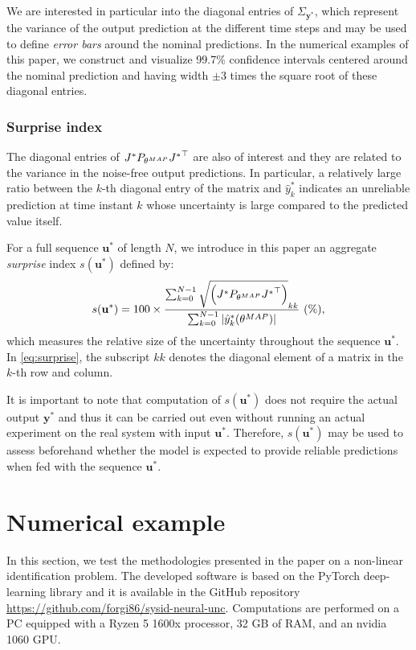 \documentclass{ifacconf}
\newcommand{\nsamp}{N}
\newcommand{\MAP}{{\rm MAP}}
\newcommand{\tvec}[1]{{\mathbf{#1}}}
\newcommand{\mean}[1]{\hat{#1}}
\begin{document}
We are interested in particular into the diagonal entries of $\Sigma_{\tvec{y}^*}$, which represent the variance of the output prediction at the different time steps and may be used to define \emph{error bars} around the nominal predictions. In the numerical examples of this paper, we construct and visualize 99.7\% confidence intervals centered around the nominal prediction and having width $\pm 3$ times the square root of these diagonal entries.

\subsubsection{Surprise index}
The diagonal entries of $J^* P_{\theta^{\MAP}} {J^*}^\top$ are also of interest and they are related to the variance in the noise-free output predictions. In particular, a relatively large ratio between the $k$-th diagonal entry of the matrix and $\mean{{y}}^*_{k}$ indicates an unreliable prediction at time instant $k$ whose uncertainty is large compared to the predicted value itself. 

For a full sequence $\tvec{u}^*$ of length $\nsamp$, we introduce in this paper an aggregate \emph{surprise} index $s(\tvec{u}^*)$ defined by:
\begin{equation}
\label{eq:surprise}
s(\tvec{u}^*) =  100 \times \frac{\sum_{k=0}^{\nsamp-1} \sqrt{\left (J^* P_{\theta^{\MAP}} {J^*}^\top \right )}_{kk}}{\sum_{k=0}^{\nsamp-1} |\mean{y}_k^{*}(\theta^{\MAP})|}~(\%),
\end{equation}
which measures the relative size of the uncertainty throughout the sequence $\tvec{u}^*$. In \eqref{eq:surprise}, the subscript  $kk$ denotes the diagonal element of a matrix in the $k$-th row and column.   

It is important to note that computation of $s(\tvec{u}^*)$ does not require the actual output $\tvec{y}^*$ and thus it can be carried out even without running an actual experiment on the real system with input $\tvec{u}^*$.
Therefore, $s(\tvec{u}^*)$ may be used to assess beforehand whether the model is expected to provide reliable predictions when fed with the sequence $\tvec{u}^*$.



\section{Numerical example}
In this section, we test the methodologies presented in the paper on a non-linear identification problem. %
The developed software is based on the PyTorch deep-learning library and it is available in the GitHub repository \url{https://github.com/forgi86/sysid-neural-unc}.
Computations are performed on a PC equipped with a Ryzen 5 1600x processor, 32 GB of RAM, and an nvidia 1060 GPU.
\end{document}
